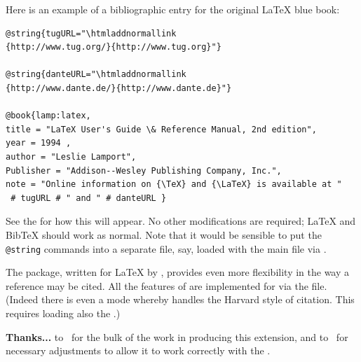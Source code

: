 \bigskip
{}%
%
\html{\\}%
\noindent
Here is an example of a bibliographic entry for the original
\LaTeX{} \cite{lamp:latex} blue book:\nobreak
\begin{small}
\begin{verbatim}
@string{tugURL="\htmladdnormallink
{http://www.tug.org/}{http://www.tug.org}"}

@string{danteURL="\htmladdnormallink
{http://www.dante.de/}{http://www.dante.de}"}

@book{lamp:latex,
title = "LaTeX User's Guide \& Reference Manual, 2nd edition",
year = 1994 ,
author = "Leslie Lamport",
Publisher = "Addison--Wesley Publishing Company, Inc.",
note = "Online information on {\TeX} and {\LaTeX} is available at "
 # tugURL # " and " # danteURL }
\end{verbatim}
\end{small}
See the  for how this will appear.\html{\\}
No other modifications are required; \LaTeX{} and Bib\TeX{} should work as normal.
%
%
Note that it would be sensible to put the \texttt{@string} commands
into a separate file,  say, 
loaded with the main file via\html{\\} \verb||.%

%
%
%
The  package, written for \LaTeX{} by \PatrickDaly,
provides even more flexibility in the way a reference may be cited. 
All the features of  are implemented 
for \latextohtml{} via the  file.
(Indeed there is even a mode whereby  handles
the Harvard style of citation. 
This requires loading also the  .)

\medskip
\noindent\textbf{Thanks...} to \Wilck\ for the bulk of the work 
in producing this extension, and to \RossMoore\ for 
necessary adjustments to allow it to work correctly with the 
.


%
